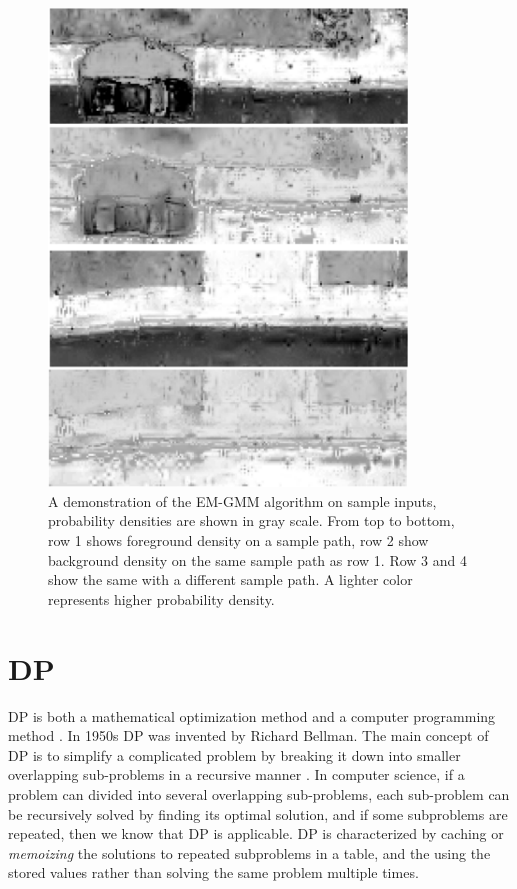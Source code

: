 \begin{figure}[H]
\centering
\includegraphics[width=0.85\textwidth]{Figures/GMM_needed.png}
\caption[Density Background Subtraction]{
A demonstration of the \ac{EM-GMM} algorithm on sample inputs, probability densities are shown in gray scale. 
From top to bottom, row 1 shows foreground density on a sample path, row 2 show background density on 
the same sample path as row 1. 
Row 3 and 4 show the same with a different sample path. 
A lighter color represents higher probability density.}
\label{fig:gmm_sample_1}
\end{figure}

\section{\ac{DP}}\label{sec:dp}

\acf{DP} is both a mathematical optimization method and a computer programming method \cite{bertsekas2005dynamic}. 
In 1950s \ac{DP} was invented by Richard Bellman\cite{bellman2013dynamic}. 
The main concept of \ac{DP} is to simplify a complicated problem by breaking it down into smaller overlapping sub-problems
 in a recursive manner \cite{howard1966dynamic}. 
In computer science, if a problem can divided into several overlapping sub-problems, 
each sub-problem can be recursively solved by finding its optimal solution, and if some subproblems are repeated, then 
we know that \ac{DP} is applicable. \ac{DP} is characterized by caching or \textit{memoizing}
 the solutions to repeated subproblems in a table, and the using the stored values rather than solving
 the same problem multiple times.  

